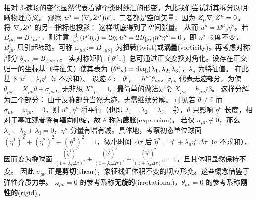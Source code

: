 相对 3-速场的变化显然代表着整个类时线汇的形变。为此我们尝试将其拆分以明晰物理意义。
观察 $u^\mu=(\nabla_\nu Z^\mu)\eta^\nu$，二者都是空间矢量，因为 $Z_\mu\nabla_\nu Z^\mu=0$。
将 $\nabla_\nu Z^\mu$ 的另一指标也投影：
这样彻底得到了空间张量。
从而 $u^\mu= B^\mu{}_\nu\eta^\nu$。若 $B_{\mu\nu}=B_{[\mu\nu]}$，则注意 $\dv{\tau}(\eta^\mu\eta_\mu)=2\eta_\mu u^\mu=2 B_{[\mu\nu]} \eta^\mu\eta^\nu = 0$，即 $\eta^\mu$ 长度不变，$B_{\mu\nu}$ 只引起转动。可称 $\omega_{\mu\nu}:=B_{[\mu\nu]}$ 为\textbf{扭转}(twist)或\textbf{涡量}(vorticity)。再考虑对称部分 $\theta_{\mu\nu}:=B_{(\mu\nu)}$。
实对称矩阵 $(\theta^\mu{}_\nu)$ 总可通过正交变换对角化。设存在正交归一的坐标基（特征矢）使其表为 $(\theta^\mu{}_\nu)=\operatorname{diag}(\lambda_1,\lambda_2,\lambda_3)$，$\lambda_a$ 为特征值。
在此基下 $u^i = \lambda_i \eta^i$（$i$ 不求和）。
设迹 $\theta:=\theta^\mu{}_\mu = h^{\mu\nu} \theta_{\mu\nu}$。$\sigma_{\mu\nu}$ 代表无迹部分。为使 $\theta_{\mu\nu}=X_{\mu\nu}\theta+\sigma_{\mu\nu}$，无非想 $X^{\mu}{}_{\mu}=1$。最简单的做法是令 $X_{\mu\nu}=h_{\mu\nu}/3$。
这样分解为三个部分：
由于反称部分当然无迹，无需继续分解。
可见若 $\theta\ne 0$ 而 $\sigma_{\mu\nu}=\omega_{\mu\nu}=0$，则 $u^\mu,\eta^\mu$ 将平行（也即 $\lambda_1=\lambda_2=\lambda_3 = \frac{\theta}{3}$），$\theta$ 只影响 $\eta^\mu$ 长度，相对于基准观者将有辐向伸缩，故 $\theta$ 称为\textbf{膨胀}(expansion)。
若仅 $\sigma_{\mu\nu}\ne 0$，那么 $\lambda_1+\lambda_2+\lambda_3 = 0$，$\eta^\mu$ 分量有增有减。具体地，考察初态单位球面 $(\eta^1)^2+(\eta^2)^2+(\eta^3)^2=1$，微小时间 $\Delta\tau$ 后 $\tilde\eta^a=\eta^a+\lambda_a\eta^a\Delta\tau$（$a$ 不求和），因而变为椭球面 $\frac{(\tilde\eta^1)^2}{(1+\lambda_1\Delta\tau)^2}+\frac{(\tilde\eta^2)^2}{(1+\lambda_2\Delta\tau)^2}+\frac{(\tilde\eta^3)^2}{(1+\lambda_3\Delta\tau)^2}=1$，且其体积显然保持不变。
因此 $\sigma_{\mu\nu}$ 正是\textbf{剪切}(shear)，象征线汇体积不变的切应形变。这些概念借鉴于弹性介质力学。
$\omega_{\mu\nu} = 0$ 的参考系称\textbf{无旋的}(irrotational)，$\theta_{\mu\nu} = 0$ 的参考系称\textbf{刚性的}(rigid)。


